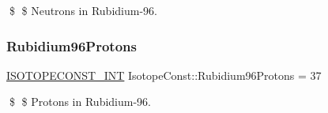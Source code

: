 \$ \$ Neutrons in Rubidium-\/96. \mbox{\label{group___isotope_const-_rubidium-_rb96_ga77cafe55cec52573ecf0b79ef4a9afe7}} 
\subsubsection{\texorpdfstring{Rubidium96\+Protons}{Rubidium96Protons}}
{\footnotesize\ttfamily \mbox{\hyperlink{group___isotope_const-_macros_ga5f18360b3e99483a35c32d789e62621c}{I\+S\+O\+T\+O\+P\+E\+C\+O\+N\+S\+T\+\_\+\+I\+NT}} Isotope\+Const\+::\+Rubidium96\+Protons = 37}

\$ \$ Protons in Rubidium-\/96. 